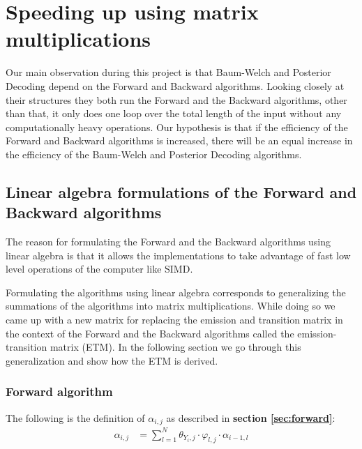 \section{Speeding up using matrix multiplications}\label{sec:ForwardBackward}

Our main observation during this project is that Baum-Welch and Posterior Decoding depend on the Forward and Backward algorithms. Looking closely at their structures they both run the Forward and the Backward algorithms, other than that, it only does one loop over the total length of the input without any computationally heavy operations. Our hypothesis is that if the efficiency of the Forward and Backward algorithms is increased, there will be an equal increase in the efficiency of the Baum-Welch and Posterior Decoding algorithms.

\subsection{Linear algebra formulations of the Forward and Backward algorithms}

The reason for formulating the Forward and the Backward algorithms using linear algebra is that it allows the implementations to take advantage of fast low level operations of the computer like SIMD.

Formulating the algorithms using linear algebra corresponds to generalizing the summations of the algorithms into matrix multiplications. While doing so we came up with a new matrix for replacing the emission and transition matrix in the context of the Forward and the Backward algorithms called the emission-transition matrix (ETM). In the following section we go through this generalization and show how the ETM is derived.

\subsubsection{Forward algorithm}
The following is the definition of $\alpha_{i,j}$ as described in \textbf{section \ref{sec:forward}}:
\begin{align}\label{forward:summation}
  \alpha_{i,j} &= \sum\limits_{l=1}^{N} \theta_{Y_i,j}\cdot\varphi_{l,j}\cdot\alpha_{i-1,l}
\end{align}

